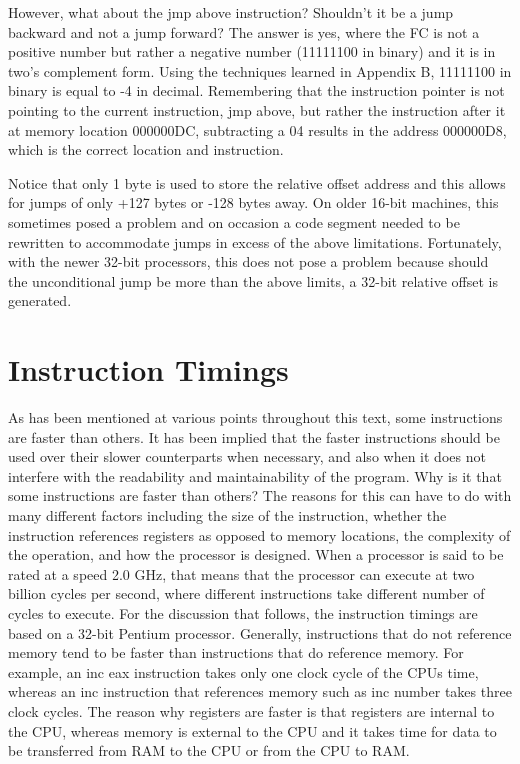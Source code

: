 \documentclass[10pt]{book}
\begin{document}
However, what about the jmp above instruction? Shouldn't it be a jump backward and not a jump forward? The answer is yes, where the FC is not a positive number but rather a negative number (11111100 in binary) and it is in two's complement form. Using the techniques learned in Appendix B, 11111100 in binary is equal to -4 in decimal. Remembering that the instruction pointer is not pointing to the current instruction, jmp above, but rather the instruction after it at memory location 000000DC, subtracting a 04 results in the address 000000D8, which is the correct location and instruction.

Notice that only 1 byte is used to store the relative offset address and this allows for jumps of only +127 bytes or -128 bytes away. On older 16-bit machines, this sometimes posed a problem and on occasion a code segment needed to be rewritten to accommodate jumps in excess of the above limitations. Fortunately, with the newer 32-bit processors, this does not pose a problem because should the unconditional jump be more than the above limits, a 32-bit relative offset is generated.

\section{Instruction Timings}
As has been mentioned at various points throughout this text, some instructions are faster than others. It has been implied that the faster instructions should be used over their slower counterparts when necessary, and also when it does not interfere with the readability and maintainability of the program. Why is it that some instructions are faster than others? The reasons for this can have to do with many different factors including the size of the instruction, whether the instruction references registers as opposed to memory locations, the complexity of the operation, and how the processor is designed. When a processor is said to be rated at a speed 2.0 GHz, that means that the processor can execute at two billion cycles per second, where different instructions take different number of cycles to execute. For the discussion that follows, the instruction timings are based on a 32-bit Pentium processor.
Generally, instructions that do not reference memory tend to be faster than instructions that do reference memory. For example, an inc eax instruction takes only one clock cycle of the CPUs time, whereas an inc instruction that references memory such as inc number takes three clock cycles. The reason why registers are faster is that registers are internal to the CPU, whereas memory is external to the CPU and it takes time for data to be transferred from RAM to the CPU or from the CPU to RAM.
\end{document}
